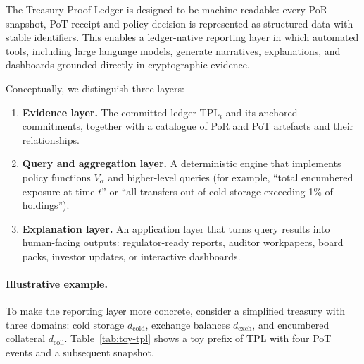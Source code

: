 \documentclass[11pt]{article}
\begin{document}
The Treasury Proof Ledger is designed to be machine-readable: every PoR snapshot, PoT receipt and policy decision is represented as structured data with stable identifiers.
This enables a ledger-native reporting layer in which automated tools, including large language models, generate narratives, explanations, and dashboards grounded directly in cryptographic evidence.

Conceptually, we distinguish three layers:

\begin{enumerate}[noitemsep]
\item \textbf{Evidence layer.} The committed ledger $\mathrm{TPL}_i$ and its anchored commitments, together with a catalogue of PoR and PoT artefacts and their relationships.
\item \textbf{Query and aggregation layer.} A deterministic engine that implements policy functions $V_\alpha$ and higher-level queries (for example, ``total encumbered exposure at time $t$'' or ``all transfers out of cold storage exceeding 1\% of holdings'').
\item \textbf{Explanation layer.} An application layer that turns query results into human-facing outputs: regulator-ready reports, auditor workpapers, board packs, investor updates, or interactive dashboards.
\end{enumerate}

\paragraph{Illustrative example.}
To make the reporting layer more concrete, consider a simplified treasury with three domains:
cold storage $d_{\mathrm{cold}}$, exchange balances $d_{\mathrm{exch}}$, and encumbered collateral $d_{\mathrm{coll}}$.
Table~\ref{tab:toy-tpl} shows a toy prefix of $\mathrm{TPL}$ with four PoT events and a subsequent snapshot.
\end{document}
